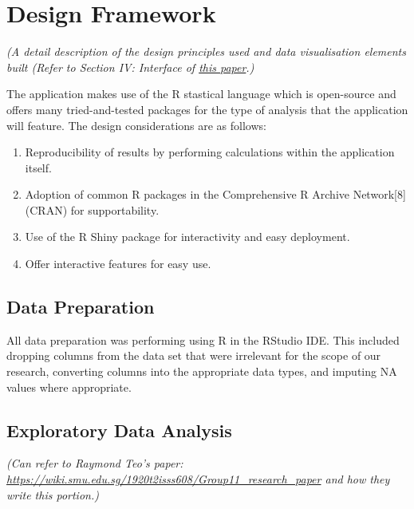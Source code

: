 \documentclass{acm_proc_article-sp}
\providecommand{\tightlist}{%
  \setlength{\itemsep}{0pt}\setlength{\parskip}{0pt}}
\begin{document}
\hypertarget{design-framework}{%
\section{Design Framework}\label{design-framework}}

\emph{(A detail description of the design principles used and data
visualisation elements built (Refer to Section IV: Interface of
\href{https://ink.library.smu.edu.sg/cgi/viewcontent.cgi?article=2760\&context=sis_research}{this
paper}.)}

The application makes use of the R stastical language which is
open-source and offers many tried-and-tested packages for the type of
analysis that the application will feature. The design considerations
are as follows:

\begin{enumerate}
\def\labelenumi{\arabic{enumi}.}
\tightlist
\item
  Reproducibility of results by performing calculations within the
  application itself.\\
\item
  Adoption of common R packages in the Comprehensive R Archive
  Network{[}8{]} (CRAN) for supportability.\\
\item
  Use of the R Shiny package for interactivity and easy deployment.\\
\item
  Offer interactive features for easy use.
\end{enumerate}

\hypertarget{data-preparation}{%
\subsection{Data Preparation}\label{data-preparation}}

All data preparation was performing using R in the RStudio IDE. This
included dropping columns from the data set that were irrelevant for the
scope of our research, converting columns into the appropriate data
types, and imputing NA values where appropriate.

\hypertarget{exploratory-data-analysis}{%
\subsection{Exploratory Data Analysis}\label{exploratory-data-analysis}}

\emph{(Can refer to Raymond Teo's paper:
\url{https://wiki.smu.edu.sg/1920t2isss608/Group11_research_paper} and
how they write this portion.)}
\end{document}
